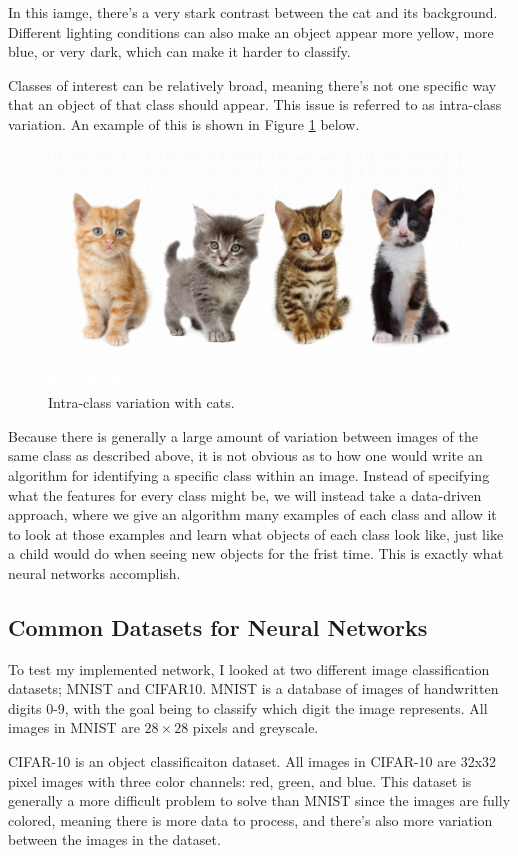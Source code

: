 \noindent In this iamge, there's a very stark contrast between the cat and its
background.  Different lighting conditions can also make an object appear more
yellow, more blue, or very dark, which can make it harder to classify.

\noindent Classes of interest can be relatively broad, meaning there's not one
specific way that an object of that class should appear. This issue is
referred to as intra-class variation. An example of this is shown in Figure
\ref{fig:intra_class_variation} below.

\begin{figure}[ht!] \centering
\includegraphics[height=2.5in]{../figures/kitty_intra_class_variation.jpg}
\caption{Intra-class variation with cats.} \label{fig:intra_class_variation}
\end{figure}

\noindent Because there is generally a large amount of variation between
images of the same class as described above, it is not obvious as to how one
would write an algorithm for identifying a specific class within an image.
Instead of specifying what the features for every class might be, we will
instead take a data-driven approach, where we give an algorithm many examples
of each class and allow it to look at those examples and learn what objects of
each class look like, just like a child would do when seeing new objects for
the frist time. This is exactly what neural networks accomplish.

\subsection{Common Datasets for Neural Networks}
To test my implemented network, I looked at two different image classification
datasets; MNIST and CIFAR10. MNIST is a database of images of handwritten
digits 0-9, with the goal being to classify which digit the image represents.
All images in MNIST are $28\times28$ pixels and greyscale.

CIFAR-10 is an object classificaiton dataset. All images in CIFAR-10 are 32x32
pixel images with three color channels: red, green, and blue. This dataset is
generally a more difficult problem to solve than MNIST since the images are
fully colored, meaning there is more data to process, and there's also more
variation between the images in the dataset.
